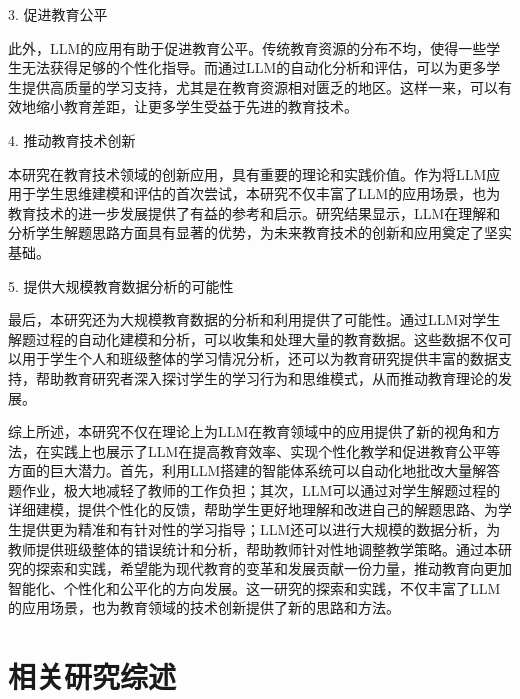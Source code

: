 3. 促进教育公平

此外，LLM的应用有助于促进教育公平。传统教育资源的分布不均，使得一些学生无法获得足够的个性化指导。而通过LLM的自动化分析和评估，可以为更多学生提供高质量的学习支持，尤其是在教育资源相对匮乏的地区。这样一来，可以有效地缩小教育差距，让更多学生受益于先进的教育技术。

4. 推动教育技术创新

本研究在教育技术领域的创新应用，具有重要的理论和实践价值。作为将LLM应用于学生思维建模和评估的首次尝试，本研究不仅丰富了LLM的应用场景，也为教育技术的进一步发展提供了有益的参考和启示。研究结果显示，LLM在理解和分析学生解题思路方面具有显著的优势，为未来教育技术的创新和应用奠定了坚实基础。

5. 提供大规模教育数据分析的可能性

最后，本研究还为大规模教育数据的分析和利用提供了可能性。通过LLM对学生解题过程的自动化建模和分析，可以收集和处理大量的教育数据。这些数据不仅可以用于学生个人和班级整体的学习情况分析，还可以为教育研究提供丰富的数据支持，帮助教育研究者深入探讨学生的学习行为和思维模式，从而推动教育理论的发展。

综上所述，本研究不仅在理论上为LLM在教育领域中的应用提供了新的视角和方法，在实践上也展示了LLM在提高教育效率、实现个性化教学和促进教育公平等方面的巨大潜力。首先，利用LLM搭建的智能体系统可以自动化地批改大量解答题作业，极大地减轻了教师的工作负担；其次，LLM可以通过对学生解题过程的详细建模，提供个性化的反馈，帮助学生更好地理解和改进自己的解题思路、为学生提供更为精准和有针对性的学习指导；LLM还可以进行大规模的数据分析，为教师提供班级整体的错误统计和分析，帮助教师针对性地调整教学策略。通过本研究的探索和实践，希望能为现代教育的变革和发展贡献一份力量，推动教育向更加智能化、个性化和公平化的方向发展。这一研究的探索和实践，不仅丰富了LLM的应用场景，也为教育领域的技术创新提供了新的思路和方法。



\section{相关研究综述}

